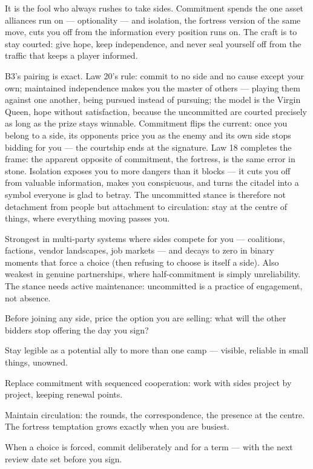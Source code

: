 \begin{core}
It is the fool who always rushes to take sides. Commitment spends the one asset alliances run on --- optionality --- and isolation, the fortress version of the same move, cuts you off from the information every position runs on. The craft is to stay courted: give hope, keep independence, and never seal yourself off from the traffic that keeps a player informed.
\end{core}
\begin{mechanism}
B3's pairing is exact. Law 20's rule: commit to no side and no cause except your own; maintained independence makes you the master of others --- playing them against one another, being pursued instead of pursuing; the model is the Virgin Queen, hope without satisfaction, because the uncommitted are courted precisely as long as the prize stays winnable. Commitment flips the current: once you belong to a side, its opponents price you as the enemy and its own side stops bidding for you --- the courtship ends at the signature. Law 18 completes the frame: the apparent opposite of commitment, the fortress, is the same error in stone. Isolation exposes you to more dangers than it blocks --- it cuts you off from valuable information, makes you conspicuous, and turns the citadel into a symbol everyone is glad to betray. The uncommitted stance is therefore not detachment from people but attachment to circulation: stay at the centre of things, where everything moving passes you.
\end{mechanism}
\begin{conditions}
Strongest in multi-party systems where sides compete for you --- coalitions, factions, vendor landscapes, job markets --- and decays to zero in binary moments that force a choice (then refusing to choose is itself a side). Also weakest in genuine partnerships, where half-commitment is simply unreliability. The stance needs active maintenance: uncommitted is a practice of engagement, not absence.
\end{conditions}
\begin{application}
  \item Before joining any side, price the option you are selling: what will the other bidders stop offering the day you sign?
  \item Stay legible as a potential ally to more than one camp --- visible, reliable in small things, unowned.
  \item Replace commitment with sequenced cooperation: work with sides project by project, keeping renewal points.
  \item Maintain circulation: the rounds, the correspondence, the presence at the centre. The fortress temptation grows exactly when you are busiest.
  \item When a choice is forced, commit deliberately and for a term --- with the next review date set before you sign.
\end{application}
